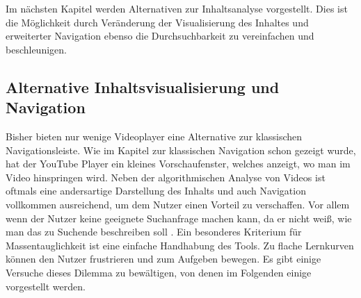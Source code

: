 \documentclass[11pt,a4paper]{report}
\begin{document}
Im nächsten Kapitel werden Alternativen zur Inhaltsanalyse vorgestellt. Dies ist die Möglichkeit durch Veränderung der Visualisierung des Inhaltes und erweiterter Navigation ebenso die Durchsuchbarkeit zu vereinfachen und beschleunigen.

\subsection{Alternative Inhaltsvisualisierung und Navigation}

Bisher bieten nur wenige Videoplayer eine Alternative zur klassischen Navigationsleiste. Wie im Kapitel zur klassischen Navigation schon gezeigt wurde, hat der YouTube Player ein kleines Vorschaufenster, welches anzeigt, wo man im Video hinspringen wird. Neben der algorithmischen Analyse von Videos ist oftmals eine andersartige Darstellung des Inhalts und auch Navigation vollkommen ausreichend, um dem Nutzer einen Vorteil zu verschaffen. Vor allem wenn der Nutzer keine geeignete Suchanfrage machen kann, da er nicht weiß, wie man das zu Suchende beschreiben soll \cite{muller2012demonstration}. Ein besonderes Kriterium für Massentauglichkeit ist eine einfache Handhabung des Tools. Zu flache Lernkurven können den Nutzer frustrieren und zum Aufgeben bewegen. Es gibt einige Versuche dieses Dilemma zu bewältigen, von denen im Folgenden einige vorgestellt werden. \cite{schoeffmann2014video}
\end{document}
